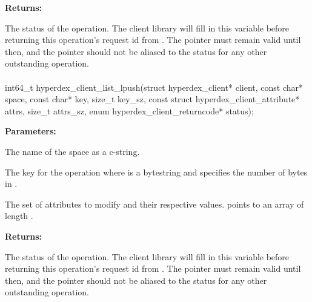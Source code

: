 \noindent\textbf{Returns:}
\begin{description}[labelindent=\widthof{{\code{status}}},leftmargin=*,noitemsep,nolistsep,align=right]
\item[\code{status}] The status of the operation.  The client library will fill in this variable before returning this operation's request id from .  The pointer must remain valid until then, and the pointer should not be aliased to the status for any other outstanding operation.
\end{description}

\paragraph{}
\begin{ccode}
int64_t hyperdex_client_list_lpush(struct hyperdex_client* client,
                const char* space,
                const char* key, size_t key_sz,
                const struct hyperdex_client_attribute* attrs, size_t attrs_sz,
                enum hyperdex_client_returncode* status);
\end{ccode}
\funcdesc 

\noindent\textbf{Parameters:}
\begin{description}[labelindent=\widthof{{\code{attrs}, \code{attrs\_sz}}},leftmargin=*,noitemsep,nolistsep,align=right]
\item[\code{space}] The name of the space as a c-string.
\item[\code{key}, \code{key\_sz}] The key for the operation where  is a bytestring and  specifies the number of bytes in .
\item[\code{attrs}, \code{attrs\_sz}] The set of attributes to modify and their respective values.   points to an array of length .
\end{description}

\noindent\textbf{Returns:}
\begin{description}[labelindent=\widthof{{\code{status}}},leftmargin=*,noitemsep,nolistsep,align=right]
\item[\code{status}] The status of the operation.  The client library will fill in this variable before returning this operation's request id from .  The pointer must remain valid until then, and the pointer should not be aliased to the status for any other outstanding operation.
\end{description}

